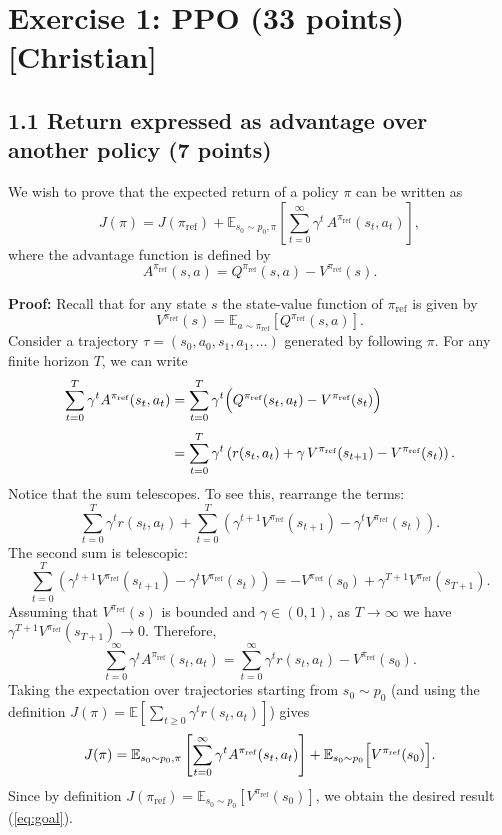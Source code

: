 
\section*{Exercise 1: PPO (33 points) [Christian]}

\subsection*{1.1 Return expressed as advantage over another policy (7 points)}

We wish to prove that the expected return of a policy $\pi$ can be written as
\begin{equation}
  J(\pi) = J(\pi_{\text{ref}}) + \mathbb{E}_{s_0\sim p_0,\pi} \left[ \sum_{t=0}^{\infty} \gamma^t \, A^{\pi_{\text{ref}}}(s_t,a_t) \right],
  \label{eq:goal}
\end{equation}
where the advantage function is defined by
\[
  A^{\pi_{\text{ref}}}(s,a) = Q^{\pi_{\text{ref}}}(s,a) - V^{\pi_{\text{ref}}}(s).
\]

\textbf{Proof:} Recall that for any state $s$ the state-value function of $\pi_{\text{ref}}$ is given by
\[
  V^{\pi_{\text{ref}}}(s) = \mathbb{E}_{a\sim\pi_{\text{ref}}} \left[ Q^{\pi_{\text{ref}}}(s,a) \right].
\]
Consider a trajectory $\tau=(s_0,a_0,s_1,a_1,\dots)$ generated by following $\pi$. For any finite horizon $T$, we can write
\begin{align*}
  \sum_{t=0}^{T} \gamma^t A^{\pi_{\text{ref}}}(s_t,a_t)
  &= \sum_{t=0}^{T} \gamma^t \Bigl( Q^{\pi_{\text{ref}}}(s_t,a_t) - V^{\pi_{\text{ref}}}(s_t) \Bigr)\\[1mm]
  &= \sum_{t=0}^{T} \gamma^t \left( r(s_t,a_t) + \gamma\, V^{\pi_{\text{ref}}}(s_{t+1}) - V^{\pi_{\text{ref}}}(s_t) \right).
\end{align*}
Notice that the sum telescopes. To see this, rearrange the terms:
\[
  \sum_{t=0}^{T} \gamma^t r(s_t,a_t)
  + \sum_{t=0}^{T} \left(\gamma^{t+1} V^{\pi_{\text{ref}}}(s_{t+1}) - \gamma^t V^{\pi_{\text{ref}}}(s_t) \right).
\]
The second sum is telescopic:
\[
  \sum_{t=0}^{T} \left(\gamma^{t+1} V^{\pi_{\text{ref}}}(s_{t+1}) - \gamma^t V^{\pi_{\text{ref}}}(s_t) \right)
  = - V^{\pi_{\text{ref}}}(s_0) + \gamma^{T+1} V^{\pi_{\text{ref}}}(s_{T+1}).
\]
Assuming that $V^{\pi_{\text{ref}}}(s)$ is bounded and $\gamma \in (0,1)$, as $T\to\infty$ we have $\gamma^{T+1} V^{\pi_{\text{ref}}}(s_{T+1})\to 0$. Therefore,
\[
  \sum_{t=0}^{\infty} \gamma^t A^{\pi_{\text{ref}}}(s_t,a_t)
  = \sum_{t=0}^{\infty} \gamma^t r(s_t,a_t) - V^{\pi_{\text{ref}}}(s_0).
\]
Taking the expectation over trajectories starting from $s_0 \sim p_0$ (and using the definition $J(\pi)=\mathbb{E}[\sum_{t\ge0}\gamma^t r(s_t,a_t)]$) gives
\[
  J(\pi) = \mathbb{E}_{s_0\sim p_0,\pi} \left[ \sum_{t=0}^{\infty} \gamma^t A^{\pi_{\text{ref}}}(s_t,a_t) \right] + \mathbb{E}_{s_0\sim p_0}\Bigl[ V^{\pi_{\text{ref}}}(s_0) \Bigr].
\]
Since by definition $J(\pi_{\text{ref}})=\mathbb{E}_{s_0\sim p_0}\left[V^{\pi_{\text{ref}}}(s_0)\right]$, we obtain the desired result (\ref{eq:goal}).

